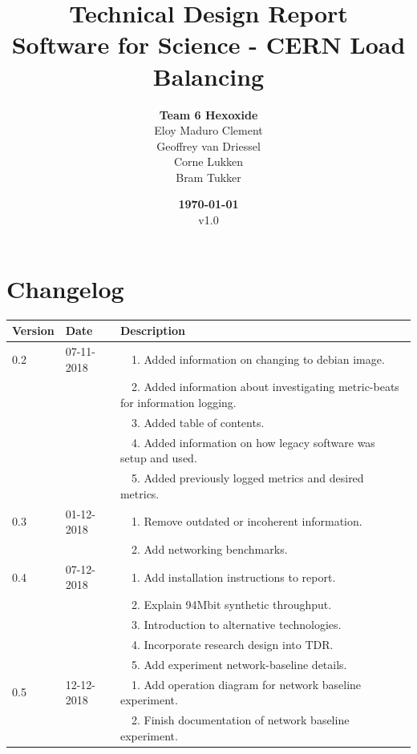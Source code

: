 \documentclass[]{article}
\title{Technical Design Report \\
	\large Software for Science - CERN Load Balancing}
\author{\textbf{Team 6 Hexoxide} \\
	Eloy Maduro Clement \\
	Geoffrey van Driessel \\
	Corne Lukken \\
	Bram Tukker}
\date{\textbf{\today} \\
	v1.0}
\newcommand{\tabitemNum}{~~}
\begin{document}
\maketitle
\newpage


\section*{Changelog}
\begin{table}[H]
	\begin{center}	
		\begin{tabularx}{\textwidth}{ | l | l | X | }
			\hline
			\textbf{Version} & \textbf{Date} & \textbf{Description} \\ \hline
			
			\multirow{1}{*}{0.2} & 07-11-2018 & \tabitemNum 1. Added information on changing to debian image. \\
			& & \tabitemNum 2. Added information about investigating metric-beats for information logging. \\
			& & \tabitemNum 3. Added table of contents. \\
			& & \tabitemNum 4. Added information on how legacy software was setup and used. \\
			& & \tabitemNum 5. Added previously logged metrics and desired metrics. \\ \hline
			
			\multirow{1}{*}{0.3} & 01-12-2018 & \tabitemNum 1. Remove outdated or incoherent information. \\
			& & \tabitemNum 2. Add networking benchmarks. \\ \hline
			
			\multirow{1}{*}{0.4} & 07-12-2018 & \tabitemNum 1. Add installation instructions to report. \\
			& & \tabitemNum 2. Explain 94Mbit synthetic throughput. \\
			& & \tabitemNum 3. Introduction to alternative technologies. \\
			& & \tabitemNum 4. Incorporate research design into TDR. \\
			& & \tabitemNum 5. Add experiment network-baseline details. \\ \hline
			
			\multirow{1}{*}{0.5} & 12-12-2018 & \tabitemNum 1. Add operation diagram for network baseline experiment. \\
			& & \tabitemNum 2. Finish documentation of network baseline experiment. \\ \hline
			

\end{tabularx}
\end{center}
\end{table}
\end{document}
